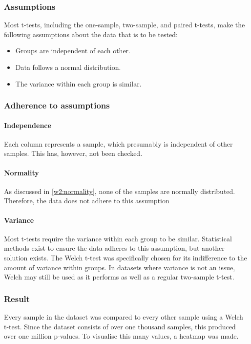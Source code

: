 \subsubsection{Assumptions}
Most t-tests, including the one-sample, two-sample, and paired t-tests, make the following assumptions about the data that is to be tested:
\begin{itemize}
    \item Groups are independent of each other.
    \item Data follows a normal distribution.
    \item The variance within each group is similar.
\end{itemize}

\subsubsection{Adherence to assumptions}
\paragraph{Independence}
Each column represents a sample, which presumably is independent of other samples.
This has, however, not been checked.

\paragraph{Normality}
As discussed in \ref{w2:normality}, none of the samples are normally distributed.
Therefore, the data does not adhere to this assumption

\paragraph{Variance}
Most t-tests require the variance within each group to be similar.
Statistical methods exist to ensure the data adheres to this assumption, but another solution exists.
The Welch t-test was specifically chosen for its indifference to the amount of variance within groups.
In datasets where variance is not an issue, Welch may still be used as it performs as well as a regular two-sample t-test.

\subsubsection{Result}
Every sample in the dataset was compared to every other sample using a Welch t-test.
Since the dataset consists of over one thousand samples, this produced over one million p-values.
To visualise this many values, a heatmap was made.

